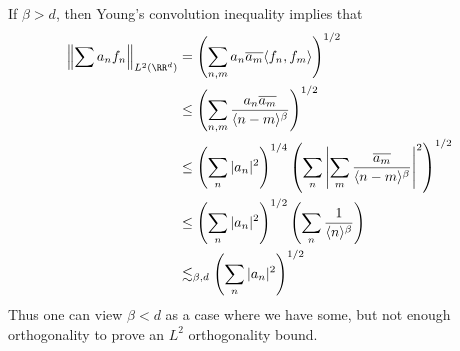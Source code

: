 \begin{remark}
  If $\beta > d$, then Young's convolution inequality implies that
  \begin{align*}
    \left\| \sum a_n f_n \right\|_{L^2(\RR^d)} &= \left( \sum_{n,m} a_n \overline{a_m} \langle f_n,f_m \rangle \right)^{1/2}\\
    &\leq \left( \sum_{n,m} \frac{a_n \overline{a_m}}{\langle n - m \rangle^\beta} \right)^{1/2}\\
    &\leq \left( \sum_n |a_n|^2 \right)^{1/4} \left( \sum_n \left| \sum_m \frac{\overline{a_m}}{\langle n - m \rangle^\beta} \right|^2 \right)^{1/2}\\
    &\leq \left( \sum_n |a_n|^2 \right)^{1/2} \left( \sum_n \frac{1}{\langle n \rangle^\beta} \right)\\
    &\lesssim_{\beta,d} \left( \sum_n |a_n|^2 \right)^{1/2}
  \end{align*}
  Thus one can view $\beta < d$ as a case where we have some, but not enough orthogonality to prove an $L^2$ orthogonality bound.
\end{remark}

